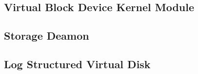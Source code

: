 \subsection{Virtual Block Device Kernel Module}

\subsection{Storage Deamon}

\subsection{Log Structured Virtual Disk}